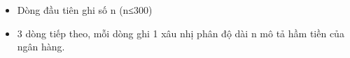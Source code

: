 \begin{itemize}
	\item     Dòng đầu tiên ghi số n (n≤300)   
	\item     3 dòng tiếp theo, mỗi dòng ghi 1 xâu nhị phân độ dài n mô tả hầm tiền của ngân hàng.   
\end{itemize}